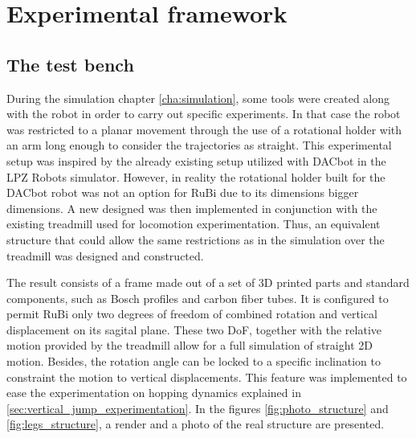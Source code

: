 \chapter{Experimental framework} %
\label{cha:experiments}

\section{The test bench} %
\label{sec:the_test_bench}
During the simulation chapter \ref{cha:simulation}, some tools were created along with the robot in order to carry out specific experiments.
In that case the robot was restricted to a planar movement through the use of a rotational holder with an arm long enough to consider the trajectories as straight.
This experimental setup was inspired by the already existing setup utilized with DACbot in the LPZ Robots simulator.
However, in reality the rotational holder built for the DACbot robot was not an option for RuBi due to its dimensions bigger dimensions.
A new designed was then implemented in conjunction with the existing treadmill used for locomotion experimentation.
Thus, an equivalent structure that could allow the same restrictions as in the simulation over the treadmill was designed and constructed.

The result consists of a frame made out of a set of 3D printed parts and standard components, such as Bosch profiles and carbon fiber tubes.
It is configured to permit RuBi only two degrees of freedom of combined rotation and vertical displacement on its sagital plane.
These two DoF, together with the relative motion provided by the treadmill allow for a full simulation of straight 2D motion.
Besides, the rotation angle can be locked to a specific inclination to constraint the motion to vertical displacements.
This feature was implemented to ease the experimentation on hopping dynamics explained in \ref{sec:vertical_jump_experimentation}.
In the figures \ref{fig:photo_structure} and \ref{fig:legs_structure}, a render and a photo of the real structure are presented.

